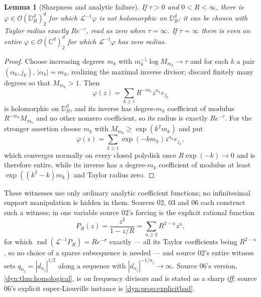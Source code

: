 \documentclass[11pt,letterpaper]{article}
\newtheorem{lemma}[lemma]{Lemma}
\theoremstyle{definition}
\theoremstyle{remark}
\newcommand{\C}{\mathbb C}
\newcommand{\OO}{\mathcal O}
\newcommand{\rad}{\operatorname{rad}}
\newcommand{\Li}{\mathcal L}
\numberwithin{equation}{section}
\begin{document}
\begin{lemma}[Sharpness and analytic failure]\label{dyn:lem:sharp-divisor}
If $\tau>0$ and $0<R<\infty$, there is
$\varphi\in\OO(\mathbb D_R^{d})_2^{d}$ for which $\Li^{-1}\varphi$ is not
holomorphic on $\mathbb D_R^{d}$; it can be chosen with Taylor radius
exactly $Re^{-\tau}$, read as zero when $\tau=\infty$. If $\tau=\infty$
there is even an \emph{entire} $\varphi\in\OO(\C^{d})_2^{d}$ for which
$\Li^{-1}\varphi$ has zero radius.
\end{lemma}
\begin{proof}
Choose increasing degrees $m_k$ with $m_k^{-1}\log M_{m_k}\to\tau$ and for
each $k$ a pair $(\alpha_k,j_k)$, $|\alpha_k|=m_k$, realizing the maximal
inverse divisor; discard finitely many degrees so that $M_{m_k}>1$. Then
\begin{equation}\label{dyn:eq:finite-radius-witness}
 \varphi(z)=\sum_{k\ge1}R^{-m_k}z^{\alpha_k}e_{j_k}
\end{equation}
is holomorphic on $\mathbb D_R^{d}$, and its inverse has degree-$m_k$
coefficient of modulus $R^{-m_k}M_{m_k}$ and no other nonzero coefficient,
so its radius is exactly $Re^{-\tau}$. For the stronger assertion choose
$m_k$ with $M_{m_k}\ge\exp(k^{2}m_k)$ and put
\begin{equation}\label{dyn:eq:entire-witness}
 \varphi(z)=\sum_{k\ge1}\exp(-km_k)z^{\alpha_k}e_{j_k},
\end{equation}
which converges normally on every closed polydisk once $R\exp(-k)\to0$ and
is therefore entire, while its inverse has a degree-$m_k$ coefficient of
modulus at least $\exp((k^{2}-k)m_k)$ and Taylor radius zero.
\end{proof}

These witnesses use only ordinary analytic coefficient functions; no
infinitesimal support manipulation is hidden in them. Sources 02, 03 and 06
each construct such a witness; in one variable source 02's forcing is the
explicit rational function
\begin{equation}\label{dyn:eq:PR}
 P_R(z)=\frac{z^{2}}{1-z/R}=\sum_{n\ge2}R^{2-n}z^{n},
\end{equation}
for which $\rad(\Li^{-1}P_R)=Re^{-\sigma}$ exactly --- all its Taylor
coefficients being $R^{2-n}$, so no choice of a sparse subsequence is
needed --- and source 02's entire witness sets
$q_{n_j}=|d_{n_j}|^{1/2}$ along a sequence with
$|d_{n_j}|^{-1/n_j}\to\infty$. Source 06's version,
\cref{dyn:thm:homological}, is on frequency divisors and is stated as a
sharp \emph{iff}; source 06's explicit super-Liouville instance is
\cref{dyn:prop:explicitbad}.
\end{document}
